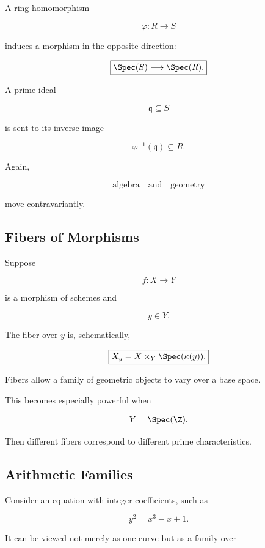 A ring homomorphism

\[
\varphi:R\to S
\]

induces a morphism in the opposite direction:

\[
\boxed{
\Spec(S)\longrightarrow\Spec(R).
}
\]

A prime ideal

\[
\mathfrak q\subseteq S
\]

is sent to its inverse image

\[
\boxed{
\varphi^{-1}(\mathfrak q)\subseteq R.
}
\]

Again,

\[
\boxed{
\text{algebra}
\quad\text{and}\quad
\text{geometry}
}
\]

move contravariantly.

\subsection{Fibers of Morphisms}
\label{subsec:scheme-fibers}

Suppose

\[
f:X\to Y
\]

is a morphism of schemes and

\[
y\in Y.
\]

The fiber over \(y\) is, schematically,

\[
\boxed{
X_y
=
X\times_Y\Spec(\kappa(y)).
}
\]

Fibers allow a family of geometric objects to vary over a base space.

This becomes especially powerful when

\[
Y=\Spec(\Z).
\]

Then different fibers correspond to different prime characteristics.

\subsection{Arithmetic Families}
\label{subsec:arithmetic-families}

Consider an equation with integer coefficients, such as

\[
y^2=x^3-x+1.
\]

It can be viewed not merely as one curve but as a family over

